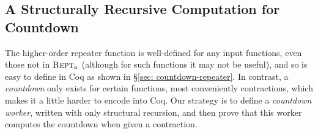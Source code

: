 
\subsection{A Structurally Recursive Computation for Countdown}

The higher-order repeater function is well-defined for any input functions, even those not in $\text{\scshape{Rept}}_a$ (although for such functions it may not be useful), and so is easy to define
in Coq as shown in \S\ref{sec: countdown-repeater}. In contrast, a \emph{countdown} only exists 
for certain functions, most conveniently contractions, which makes it a little harder to
encode into Coq. Our strategy is to define a \emph{countdown worker}, written with only
structural recursion, and then prove that this worker computes the countdown when given a contraction.

